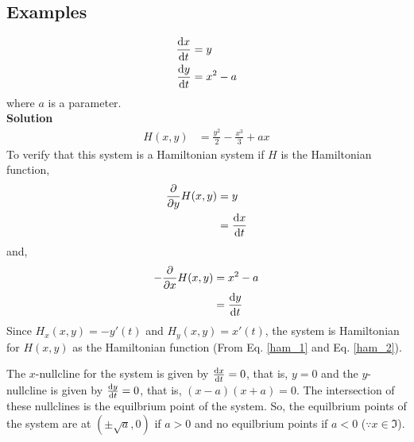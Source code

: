 \documentclass[12pt,1in]{article}
\newenvironment{Example}[2][Example]{\begin{trivlist}
		\item[\hskip \labelsep {\bfseries #1}\hskip \labelsep {\bfseries #2.}]}{\end{trivlist}}
\begin{document}
\subsection{Examples}
\begin{Example}{1}
	\begin{align*}
	\derivative{x}{t} &= y \\
	\derivative{y}{t} &= x^2 - a
	\end{align*}
	where $a$ is a parameter. \\
	{\bfseries Solution\\}
	\begin{align*}
	H(x,y) &= \frac{y^2}{2} - \frac{x^3}{3} + ax
	\end{align*}
	To verify that this system is a Hamiltonian system if $H$ is the Hamiltonian function,
	\begin{align*}
	\frac{\partial}{\partial y}H(x,y) &= y\\
	&= \derivative{x}{t}
	\end{align*}
	and,
	\begin{align*}
	- \frac{\partial}{\partial x} H(x,y) &= x^2 - a\\
	&= \derivative{y}{t}
	\end{align*}
	Since $H_x(x,y) = - y'(t)$ and $H_y(x,y) = x'(t)$, the system is Hamiltonian for $H(x,y)$ as the Hamiltonian function (From Eq. \ref{ham_1} and Eq. \ref{ham_2}).
	
	
	The $x$-nullcline for the system is given by $\derivative{x}{t} = 0$, that is, $y = 0$ and the $y$-nullcline is given by $\derivative{y}{t}=0$, that is, $(x -a)(x+a) = 0$. The intersection of these nullclines is the equilbrium point of the system. So, the equilbrium points of the system are at $(\pm\sqrt{a}, 0)$ if $a > 0$ and no equilbrium points if $a < 0$ ($\because x \in \Im$).
	

\end{Example}
\end{document}
